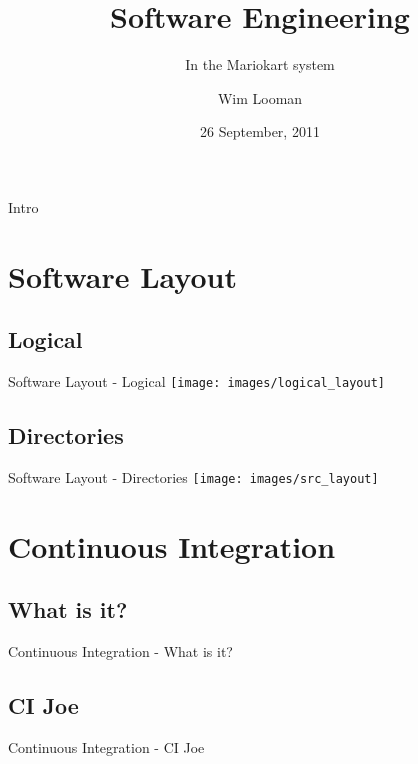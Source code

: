 \documentclass[xcolor=dvipsnames]{beamer}
\author{Wim Looman}
\title{Software Engineering}
\subtitle{In the Mariokart system}
\institute[UC]
{
  Department of Electrical Engineering\\
  University of Canterbury\\
  New Zealand
}
\date{26 September, 2011}
\begin{document}
  \begin{frame}[plain]
    \titlepage
  \end{frame}

  \begin{frame}{Intro}
    \tableofcontents
  \end{frame}

  \section{Software Layout}
    \subsection{Logical}
      \begin{frame}{Software Layout - Logical}
        \texttt{[image: images/logical\_layout]}
      \end{frame}

    \subsection{Directories}
      \begin{frame}{Software Layout - Directories}
        \texttt{[image: images/src\_layout]}
      \end{frame}

  \section{Continuous Integration}
    \subsection{What is it?}
      \begin{frame}{Continuous Integration - What is it?}
      \end{frame}

    \subsection{CI Joe}
      \begin{frame}{Continuous Integration - CI Joe}
      \end{frame}
\end{document}
